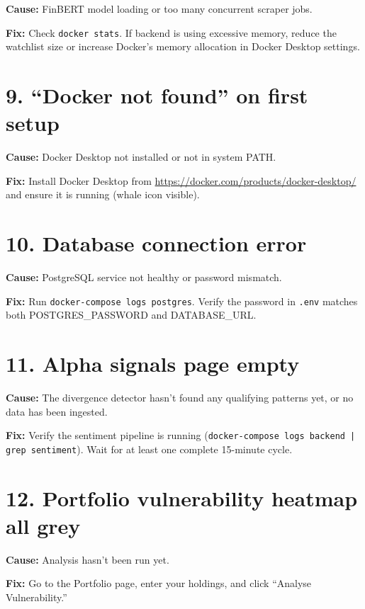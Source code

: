\documentclass[12pt, a4paper]{report}
\begin{document}
\textbf{Cause:} FinBERT model loading or too many concurrent scraper jobs.

\textbf{Fix:} Check \texttt{docker stats}. If backend is using excessive memory, reduce the watchlist size or increase Docker's memory allocation in Docker Desktop settings.

\section{9. ``Docker not found'' on first setup}

\textbf{Cause:} Docker Desktop not installed or not in system PATH.

\textbf{Fix:} Install Docker Desktop from \url{https://docker.com/products/docker-desktop/} and ensure it is running (whale icon visible).

\section{10. Database connection error}

\textbf{Cause:} PostgreSQL service not healthy or password mismatch.

\textbf{Fix:} Run \texttt{docker-compose logs postgres}. Verify the password in \texttt{.env} matches both POSTGRES\_PASSWORD and DATABASE\_URL.

\section{11. Alpha signals page empty}

\textbf{Cause:} The divergence detector hasn't found any qualifying patterns yet, or no data has been ingested.

\textbf{Fix:} Verify the sentiment pipeline is running (\texttt{docker-compose logs backend | grep sentiment}). Wait for at least one complete 15-minute cycle.

\section{12. Portfolio vulnerability heatmap all grey}

\textbf{Cause:} Analysis hasn't been run yet.

\textbf{Fix:} Go to the Portfolio page, enter your holdings, and click ``Analyse Vulnerability.''

\end{document}
